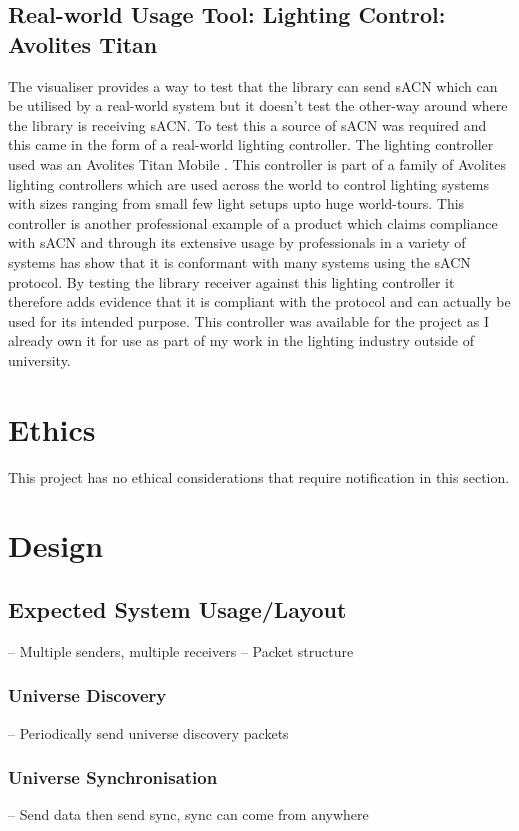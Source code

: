 \documentclass[11pt,a4paper]{report}
\begin{document}
\subsection{Real-world Usage Tool: Lighting Control: Avolites Titan}
The visualiser provides a way to test that the library can send sACN which can be utilised by a real-world system but it doesn't test the other-way around where the library is receiving sACN. To test this a source of sACN was required and this came in the form of a real-world lighting controller. The lighting controller used was an Avolites Titan Mobile \cite{AVO_TITAN_MOBILE}. This controller is part of a family of Avolites lighting controllers which are used across the world to control lighting systems with sizes ranging from small few light setups upto huge world-tours. This controller is another professional example of a product which claims compliance with sACN and through its extensive usage by professionals in a variety of systems has show that it is conformant with many systems using the sACN protocol. By testing the library receiver against this lighting controller it therefore adds evidence that it is compliant with the protocol and can actually be used for its intended purpose. This controller was available for the project as I already own it for use as part of my work in the lighting industry outside of university. 

\section{Ethics}
This project has no ethical considerations that require notification in this section.
	
\section{Design}
\subsection{Expected System Usage/Layout}
-- Multiple senders, multiple receivers
-- Packet structure


\subsubsection{Universe Discovery}
-- Periodically send universe discovery packets

\subsubsection{Universe Synchronisation}
-- Send data then send sync, sync can come from anywhere
\end{document}
